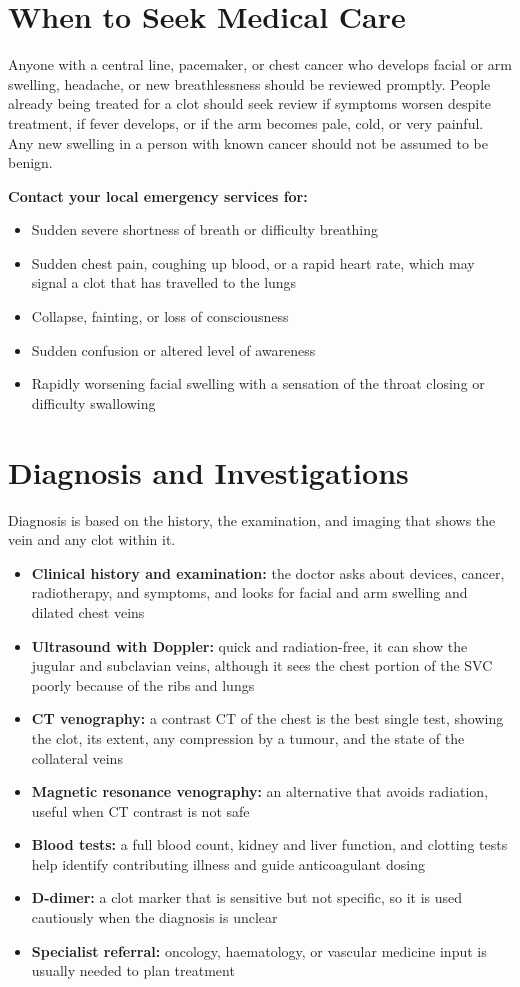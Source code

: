 \section*{When to Seek Medical Care}
Anyone with a central line, pacemaker, or chest cancer who develops facial or arm swelling, headache, or new breathlessness should be reviewed promptly. People already being treated for a clot should seek review if symptoms worsen despite treatment, if fever develops, or if the arm becomes pale, cold, or very painful. Any new swelling in a person with known cancer should not be assumed to be benign.

\textbf{Contact your local emergency services for:}
\begin{itemize}
    \item Sudden severe shortness of breath or difficulty breathing
    \item Sudden chest pain, coughing up blood, or a rapid heart rate, which may signal a clot that has travelled to the lungs
    \item Collapse, fainting, or loss of consciousness
    \item Sudden confusion or altered level of awareness
    \item Rapidly worsening facial swelling with a sensation of the throat closing or difficulty swallowing
\end{itemize}

\section*{Diagnosis and Investigations}
Diagnosis is based on the history, the examination, and imaging that shows the vein and any clot within it.

\begin{itemize}
    \item \textbf{Clinical history and examination:} the doctor asks about devices, cancer, radiotherapy, and symptoms, and looks for facial and arm swelling and dilated chest veins
    \item \textbf{Ultrasound with Doppler:} quick and radiation-free, it can show the jugular and subclavian veins, although it sees the chest portion of the SVC poorly because of the ribs and lungs
    \item \textbf{CT venography:} a contrast CT of the chest is the best single test, showing the clot, its extent, any compression by a tumour, and the state of the collateral veins
    \item \textbf{Magnetic resonance venography:} an alternative that avoids radiation, useful when CT contrast is not safe
    \item \textbf{Blood tests:} a full blood count, kidney and liver function, and clotting tests help identify contributing illness and guide anticoagulant dosing
    \item \textbf{D-dimer:} a clot marker that is sensitive but not specific, so it is used cautiously when the diagnosis is unclear
    \item \textbf{Specialist referral:} oncology, haematology, or vascular medicine input is usually needed to plan treatment
\end{itemize}

